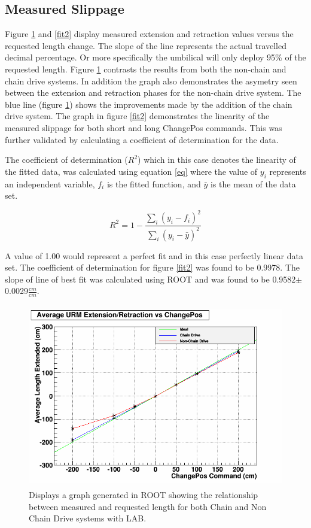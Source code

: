 \documentclass[paper=a4, fontsize=11pt]{scrartcl}
\numberwithin{equation}{section}		%
\numberwithin{figure}{section}			%
\numberwithin{table}{section}				%
\begin{document}
\subsection{Measured Slippage}
Figure \ref{fit1} and \ref{fit2} display measured extension and retraction values versus the requested length change. The slope of the line represents the actual travelled decimal percentage. Or more specifically the umbilical will only deploy 95\% of the requested length. Figure \ref{fit1} contrasts the results from both the non-chain and chain drive systems. In addition the graph also demonstrates the asymetry seen between the extension and retraction phases for the non-chain drive system. The blue line (figure \ref{fit1}) shows the improvements made by the addition of the chain drive system. The graph in figure \ref{fit2} demonstrates the linearity of the measured slippage for both short and long ChangePos commands. This was further validated by calculating a coefficient of determination for the data.


   

     


The coefficient of determination ($R^2$) which in this case denotes the linearity of the fitted data, was calculated using equation \ref{eq} where the value of $y_i$ represents an independent variable, $f_i$ is the fitted function, and $\bar{y}$ is the mean of the data set. 

\begin{equation}
\label{eq}
R^2=1-\frac{\sum\limits_{i} (y_i-f_i)^2}{\sum\limits_{i} (y_i-\bar{y})^2}
\end{equation}

A value of 1.00 would represent a perfect fit and in this case perfectly linear data set. The coefficient of determination for figure \ref{fit2} was found to be 0.9978. The slope of line of best fit was calculated using ROOT and was found to be 0.9582$\pm$0.0029$\frac{cm}{cm}$.

     \begin{figure}[H]
                \includegraphics[height=8cm]{Newumb1}
                \caption{Displays a graph generated in ROOT showing the relationship between measured and requested length for both Chain and Non Chain Drive systems with LAB.}
				\label{fit1}
        \end{figure}
\end{document}
